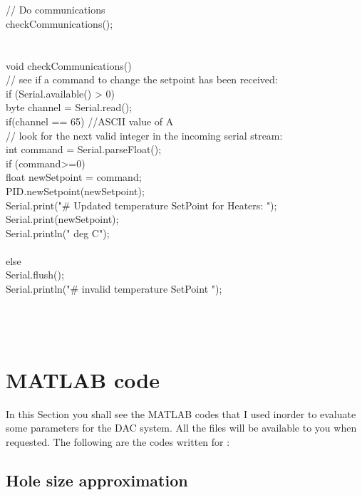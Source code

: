\begin{appendices}
{{    \\
\\
    // Do communications \\
    checkCommunications(); \\
} \\
\\
void checkCommunications(){ \\
    // see if a command to change the setpoint has been received: \\
    if (Serial.available() > 0){ \\
            byte channel = Serial.read(); \\
            if(channel == 65){          //ASCII value of A \\
            // look for the next valid integer in the incoming serial stream: \\
            int command = Serial.parseFloat(); \\
                if (command>=0){ \\
                float newSetpoint = command; \\
                PID.newSetpoint(newSetpoint); \\
                Serial.print("\# Updated temperature SetPoint for Heaters: "); \\
                Serial.print(newSetpoint); \\
                Serial.println(" deg C"); \\
                } \\
            else{ \\
                Serial.flush(); \\
                Serial.println("\# invalid temperature SetPoint "); \\
                } \\
            } \\
    } \\
}  
}


\section{MATLAB code}
\label{ap:MATLAB}

In this Section you shall see the MATLAB codes that I used inorder to evaluate some parameters for the DAC system. All the files will be available to you when requested. The following are the codes written for :

    \subsection{Hole size approximation}


\end{appendices}
